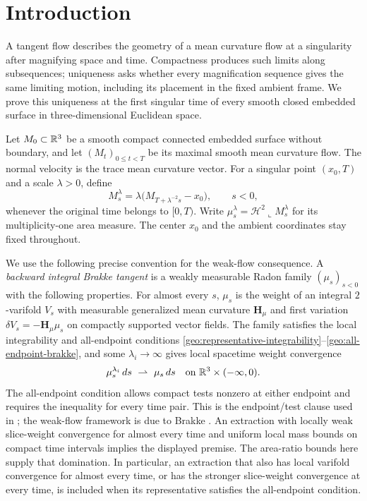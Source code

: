 \section{Introduction}\label{sec:introduction}

A tangent flow describes the geometry of a mean curvature flow at a
singularity after magnifying space and time. Compactness produces such
limits along subsequences; uniqueness asks whether every magnification
sequence gives the same limiting motion, including its placement in the
fixed ambient frame. We prove this uniqueness at the first singular time of
every smooth closed embedded surface in three-dimensional Euclidean space.

Let $M_0\subset\mathbb R^3$ be a smooth compact connected embedded surface
without boundary, and let $(M_t)_{0\le t<T}$ be its maximal smooth mean
curvature flow. The normal velocity is the trace mean curvature vector.
For a singular point $(x_0,T)$ and a scale $\lambda>0$, define
\begin{equation}\label{intro:rescalings}
 M_s^\lambda=\lambda\bigl(M_{T+\lambda^{-2}s}-x_0\bigr),\qquad s<0,
\end{equation}
whenever the original time belongs to $[0,T)$.  Write
$\mu_s^\lambda=\mathcal H^2\!\llcorner M_s^\lambda$ for its
multiplicity-one area measure.  The center $x_0$ and the ambient
coordinates stay fixed throughout.

We use the following precise convention for the weak-flow consequence.
A \emph{backward integral Brakke tangent} is a weakly measurable Radon
family $(\mu_s)_{s<0}$ with the following properties.  For almost every
$s$, $\mu_s$ is the weight of an integral $2$-varifold $V_s$ with
measurable generalized mean curvature $\mathbf H_\mu$ and first variation
$\delta V_s=-\mathbf H_\mu\mu_s$ on compactly supported vector fields.
The family satisfies the local integrability and all-endpoint conditions
\eqref{geo:representative-integrability}--\eqref{geo:all-endpoint-brakke},
and some $\lambda_i\to\infty$ gives local spacetime weight convergence
\[
 \mu_s^{\lambda_i}\,ds\ \rightharpoonup\ \mu_s\,ds
 \quad\hbox{on }\mathbb R^3\times(-\infty,0).
\]
The all-endpoint condition allows compact tests nonzero at either
endpoint and requires the inequality for every time pair.  This is the
endpoint/test clause used in \cite[Section~2.1]{BK2024}; the weak-flow
framework is due to Brakke \cite{Brakke1978}.  An extraction with locally
weak slice-weight convergence for almost every time and uniform local
mass bounds on compact time intervals implies the displayed premise.
The area-ratio bounds here supply that domination.  In particular, an
extraction that also has local varifold convergence for almost every
time, or has the stronger slice-weight convergence at every time, is
included when its representative satisfies the all-endpoint condition.

